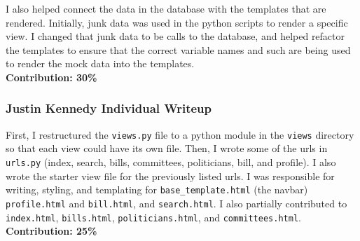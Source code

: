 \documentclass{article}
\newcommand{\n}{\noindent}
\begin{document}
I also helped connect the data in the database with the templates that are rendered. Initially, junk data was used in the python scripts to render a specific view. I changed that junk data to be calls to the database, and helped refactor the templates to ensure that the correct variable names and such are being used to render the mock data into the templates. \\

\n\textbf{Contribution: 30\%}

\pagebreak

\subsubsection*{Justin Kennedy Individual Writeup}

First, I restructured the \verb|views.py| file to a python module in the \verb|views| directory so that each view could have its own file.  Then, I wrote some of the urls in \verb|urls.py| (index, search, bills, committees, politicians, bill, and profile).  I also wrote the starter view file for the previously listed urls.  I was responsible for writing, styling, and templating for \verb|base_template.html| (the navbar) \verb|profile.html| and \verb|bill.html|, and \verb|search.html|.  I also partially contributed to \verb|index.html|, \verb|bills.html|, \verb|politicians.html|, and \verb|committees.html|.\\

\n\textbf{Contribution: 25\%}
\end{document}
